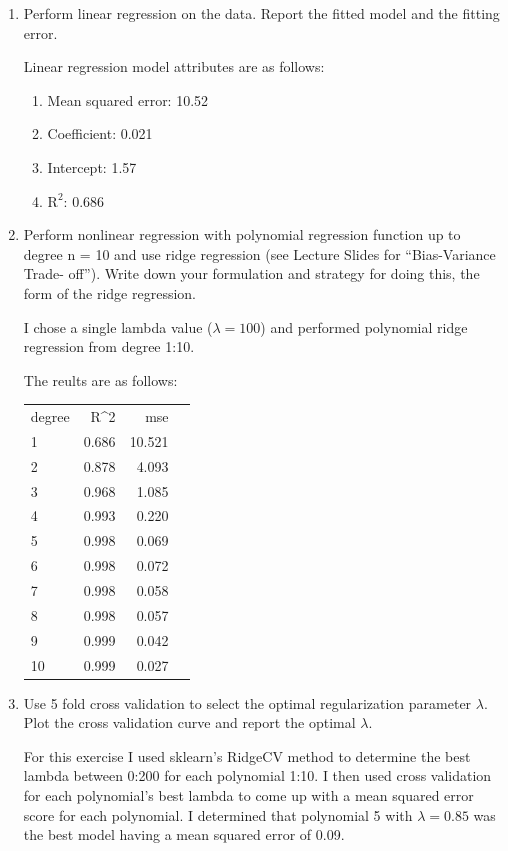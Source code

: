 \documentclass[a4paper]{article}
\begin{document}
\begin{enumerate}
\item Perform linear regression on the data. Report the fitted model and the fitting error.

Linear regression model attributes are as follows:
\begin{enumerate}[]
  \item Mean squared error: 10.52
  \item Coefficient: 0.021
  \item Intercept: 1.57
  \item $\text{R}^2$: 0.686
\end{enumerate}

\item Perform nonlinear regression with polynomial regression function up to
degree n = 10 and use ridge regression (see Lecture Slides for “Bias-Variance Trade-
off”). Write down your formulation and strategy for doing this, the form of the ridge
regression.

I chose a single lambda value ($\lambda = 100$) and performed polynomial ridge regression from degree 1:10.

The reults are as follows:

\begin{tabular}{lrrr}

degree &    R\textasciicircum 2 &     mse \\

1 &  0.686 &  10.521 \\
2 &  0.878 &   4.093 \\
3 &  0.968 &   1.085 \\
4 &  0.993 &   0.220 \\
5 &  0.998 &   0.069 \\
6 &  0.998 &   0.072 \\
7 &  0.998 &   0.058 \\
8 &  0.998 &   0.057 \\
9 &  0.999 &   0.042 \\
10 &  0.999 &   0.027 \\

\end{tabular}

\item Use 5 fold cross validation to select the optimal regularization parameter
$\lambda$. Plot the cross validation curve and report the optimal $\lambda$.

For this exercise I used sklearn's RidgeCV method to determine the best lambda between 0:200 for each polynomial 1:10.  I then used cross validation for each polynomial's best lambda to come up with a mean squared error score for each polynomial.  I determined that polynomial 5 with $\lambda=0.85$ was the best model having a mean squared error of 0.09.


\end{enumerate}
\end{document}
